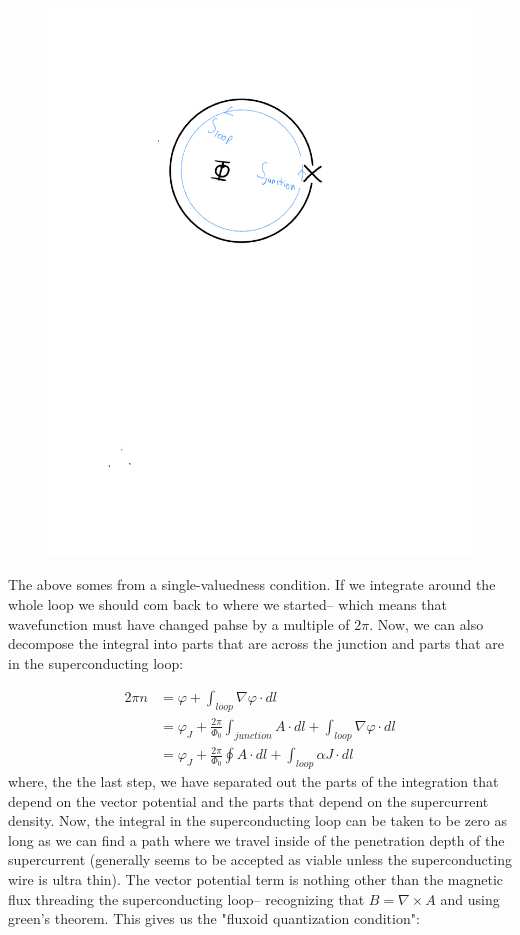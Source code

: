 \documentclass[paper=a4, twocolumn, fontsize=10pt]{article} %
\numberwithin{equation}{section} %
\numberwithin{figure}{section} %
\numberwithin{table}{section} %
\begin{document}
\begin{figure}[H]
    \centering
    \includegraphics[scale=.5]{JJ_loop.pdf}
    \end{figure}

The above somes from a single-valuedness condition. If we integrate around the whole loop we should com back to where we started-- which means that wavefunction must have changed pahse by a multiple of $2\pi$. Now, we can also decompose the integral into parts that are across the junction and parts that are in the superconducting loop:


\begin{align}
    2\pi n &= \varphi + \int_{loop} \nabla \varphi \cdot dl
    \\
    &= \varphi_J +  \frac{2\pi}{\Phi_0} \int_{junction} A  \cdot dl + \int_{loop} \nabla \varphi \cdot dl
    \\
    &= \varphi_J +  \frac{2\pi}{\Phi_0} \oint A  \cdot dl + \int_{loop} \alpha J  \cdot dl
\end{align}
where, the the last step, we have separated out the parts of the integration that depend on the vector potential and the parts that depend on the supercurrent density. Now, the integral in the superconducting loop can be taken to be zero as long as we can find a path where we travel inside of the penetration depth of the supercurrent (generally seems to be accepted as viable unless the superconducting wire is ultra thin). The vector potential term is nothing other than the magnetic flux threading the superconducting loop-- recognizing that $B = \nabla \times A$ and using green's theorem. This gives us the "fluxoid quantization condition":
\end{document}
